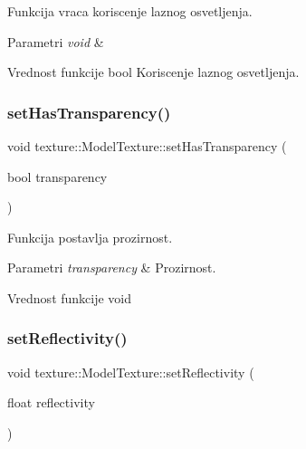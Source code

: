 Funkcija vraca koriscenje laznog osvetljenja. 


\begin{DoxyParams}{Parametri}
{\em void} & \\
\hline
\end{DoxyParams}
\begin{DoxyReturn}{Vrednost funkcije}
bool Koriscenje laznog osvetljenja. 
\end{DoxyReturn}
\mbox{\label{classtexture_1_1ModelTexture_a04240906ba55ecaaec9a793788da9c58}} 
\subsubsection{\texorpdfstring{set\+Has\+Transparency()}{setHasTransparency()}}
{\footnotesize\ttfamily void texture\+::\+Model\+Texture\+::set\+Has\+Transparency (\begin{DoxyParamCaption}\item[{bool}]{transparency }\end{DoxyParamCaption})}



Funkcija postavlja prozirnost. 


\begin{DoxyParams}{Parametri}
{\em transparency} & Prozirnost. \\
\hline
\end{DoxyParams}
\begin{DoxyReturn}{Vrednost funkcije}
void 
\end{DoxyReturn}
\mbox{\label{classtexture_1_1ModelTexture_a87d88c1857f107c1169b24d1488f5cbc}} 
\subsubsection{\texorpdfstring{set\+Reflectivity()}{setReflectivity()}}
{\footnotesize\ttfamily void texture\+::\+Model\+Texture\+::set\+Reflectivity (\begin{DoxyParamCaption}\item[{float}]{reflectivity }\end{DoxyParamCaption})}



